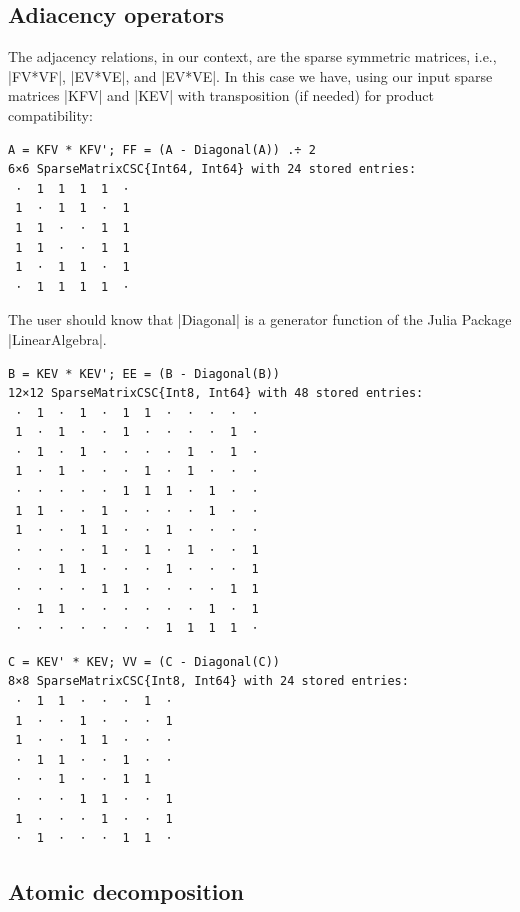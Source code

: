 \begin{coding}[Algebraic computation of FE = $\delta_1$]
\subsection{Adiacency operators}\label{sect:5-2-1}

The adjacency relations, in our context, are the sparse symmetric matrices, i.e., 
|FV*VF|, |EV*VE|, and |EV*VE|. In this case we have, using our input sparse matrices |KFV| and |KEV| with transposition (if needed) for product compatibility:

\begin{lstlisting}[language=JuliaLocal, style=julia, mathescape=true]
A = KFV * KFV'; FF = (A - Diagonal(A)) .÷ 2
6×6 SparseMatrixCSC{Int64, Int64} with 24 stored entries:
 ⋅  1  1  1  1  ⋅
 1  ⋅  1  1  ⋅  1
 1  1  ⋅  ⋅  1  1
 1  1  ⋅  ⋅  1  1
 1  ⋅  1  1  ⋅  1
 ⋅  1  1  1  1  ⋅
\end{lstlisting}

The user should know that |Diagonal| is a generator function of the Julia Package |LinearAlgebra|. 

\begin{lstlisting}[language=JuliaLocal, style=julia, mathescape=true]
B = KEV * KEV'; EE = (B - Diagonal(B))
12×12 SparseMatrixCSC{Int8, Int64} with 48 stored entries:
 ⋅  1  ⋅  1  ⋅  1  1  ⋅  ⋅  ⋅  ⋅  ⋅
 1  ⋅  1  ⋅  ⋅  1  ⋅  ⋅  ⋅  ⋅  1  ⋅
 ⋅  1  ⋅  1  ⋅  ⋅  ⋅  ⋅  1  ⋅  1  ⋅
 1  ⋅  1  ⋅  ⋅  ⋅  1  ⋅  1  ⋅  ⋅  ⋅
 ⋅  ⋅  ⋅  ⋅  ⋅  1  1  1  ⋅  1  ⋅  ⋅
 1  1  ⋅  ⋅  1  ⋅  ⋅  ⋅  ⋅  1  ⋅  ⋅
 1  ⋅  ⋅  1  1  ⋅  ⋅  1  ⋅  ⋅  ⋅  ⋅
 ⋅  ⋅  ⋅  ⋅  1  ⋅  1  ⋅  1  ⋅  ⋅  1
 ⋅  ⋅  1  1  ⋅  ⋅  ⋅  1  ⋅  ⋅  ⋅  1
 ⋅  ⋅  ⋅  ⋅  1  1  ⋅  ⋅  ⋅  ⋅  1  1
 ⋅  1  1  ⋅  ⋅  ⋅  ⋅  ⋅  ⋅  1  ⋅  1
 ⋅  ⋅  ⋅  ⋅  ⋅  ⋅  ⋅  1  1  1  1  ⋅
\end{lstlisting}


\begin{lstlisting}[language=JuliaLocal, style=julia, mathescape=true]
C = KEV' * KEV; VV = (C - Diagonal(C))
8×8 SparseMatrixCSC{Int8, Int64} with 24 stored entries:
 ⋅  1  1  ⋅  ⋅  ⋅  1  ⋅
 1  ⋅  ⋅  1  ⋅  ⋅  ⋅  1
 1  ⋅  ⋅  1  1  ⋅  ⋅  ⋅
 ⋅  1  1  ⋅  ⋅  1  ⋅  ⋅
 ⋅  ⋅  1  ⋅  ⋅  1  1  
 ⋅  ⋅  ⋅  1  1  ⋅  ⋅  1
 1  ⋅  ⋅  ⋅  1  ⋅  ⋅  1
 ⋅  1  ⋅  ⋅  ⋅  1  1  ⋅
\end{lstlisting}



\subsection{Atomic decomposition}\label{sect:5-2-3}


\end{coding}

